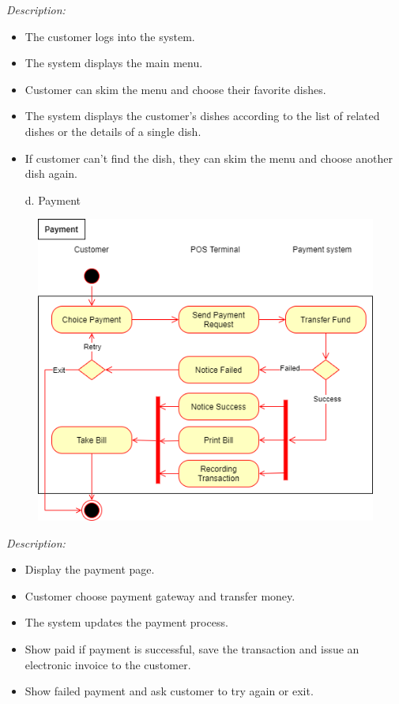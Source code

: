 \documentclass[11pt]{article}
\begin{document}
        \cleardoublepage
            \textit{Description:} 
            \begin{itemize}
                \item The customer logs into the system.
                \item The system displays the main menu.
                \item Customer can skim the menu and choose their favorite dishes.
                \item The system displays the customer's dishes according to the list of related dishes or the details of a single dish.
                \item If customer can't find the dish, they can skim the menu and choose another dish again.
            \end{itemize}
        \begin{enumerate}
            \item[d. ] Payment
        \end{enumerate}
            \begin{figure}[!h]
                \centering
                \includegraphics[scale=0.6]{Activity diagram/Payment.png}
            \end{figure}
            \textit{Description:}
            \begin{itemize}
                \item Display the payment page.
                \item Customer choose payment gateway and transfer money.
                \item The system updates the payment process.
                \item Show paid if payment is successful, save the transaction and issue an electronic invoice to the customer.
                \item Show failed payment and ask customer to try again or exit.
            \end{itemize}
\end{document}
